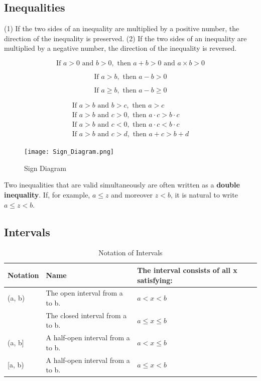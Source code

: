 \documentclass{article}
\begin{document}
\subsection{Inequalities}

(1) If the two sides of an inequality are multiplied by a positive number, the direction of the inequality is preserved.
(2) If the two sides of an inequality are multiplied by a negative number, the direction of the inequality is reversed.

\begin{equation}
 \text{If } a > 0 \text{ and } b > 0, \text{ then } a + b > 0 \text{ and } a \times b > 0
\end{equation}

\begin{equation}
 \text{If } a > b, \text{ then } a - b > 0
\end{equation}

\begin{equation}
 \text{If } a \geq b, \text{ then } a - b \geq 0
\end{equation}

\begin{align}
 \text{If } a > b \text{ and } b > c, \text{ then } a > c \\
 \text{If } a > b \text{ and } c > 0, \text{ then } a \cdot c > b \cdot c \\
 \text{If } a > b \text{ and } c < 0, \text{ then } a \cdot c < b \cdot c \\
 \text{If } a > b \text{ and } c > d, \text{ then } a + c > b + d
\end{align} 

\begin{figure}[h]
\centering
\texttt{[image: Sign\_Diagram.png]}
\caption{Sign Diagram}
\end{figure}

Two inequalities that are valid simultaneously are often written as a \textbf{double inequality}. If, for example, \(a \leq z\) and moreover \(z < b\), it is natural to write \(a \leq z < b\). \\

\subsection{Intervals}
\begin{table}[h]
\centering
\caption{Notation of Intervals} 
\begin{tabular}{l|l|l}
\hline
Notation & Name & The interval consists of all x satisfying: \\
\hline
(a, b) & The open interval from a to b. & $a < x < b$ \\
\hline
[a, b] & The closed interval from a to b. & $a \leq x \leq b$ \\
\hline
(a, b] & A half-open interval from a to b. & $a < x \leq b$ \\
\hline
[a, b) & A half-open interval from a to b. & $a \leq x < b$ \\
\hline
\end{tabular}
\end{table}
\end{document}
